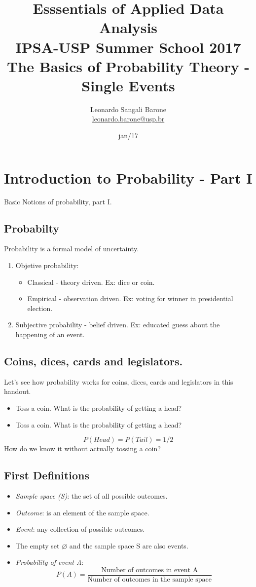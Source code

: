 \documentclass[11pt]{article}
\title{\textbf{Esssentials of Applied Data Analysis\\
				IPSA-USP Summer School 2017}\newline\\
				The Basics of Probability Theory - Single Events}
\author{Leonardo Sangali Barone\\ \href{leonardo.barone@usp.br}{leonardo.barone@usp.br}}
\date{jan/17}
\let\emptyset\varnothing
\begin{document}
\maketitle

\section*{Introduction to Probability - Part I}

	Basic Notions of probability, part I.
	
	\subsection*{Probabilty}
	Probability is a formal model of uncertainty.

	\begin{enumerate}
	\item Objetive probability:
		\begin{itemize}
			\item Classical - theory driven. Ex: dice or coin.
			\item Empirical - observation driven. Ex: voting for winner in presidential election.
		\end{itemize}
	\item Subjective probability - belief driven. Ex: educated guess about the happening of an event.
	\end{enumerate}

	\subsection*{Coins, dices, cards and legislators.}
	
	Let's see how probability works for coins, dices, cards and legislators in this handout.
	
		\begin{itemize}
			\item Toss a coin. What is the probability of getting a head?
			\item Toss a coin. What is the probability of getting a head?
		\end{itemize}
	\[P(Head) = P(Tail) = 1/2	\]
	How do we know it without actually tossing a coin?

	\subsection*{First Definitions}
	\begin{itemize}
		\item \emph{Sample space (S)}: the set of all possible outcomes.
		\item \emph{Outcome}: is an element of the sample space.
		\item \emph{Event}: any collection of possible outcomes.
		\item The empty set $\emptyset$ and the sample space S are also events.	
		\item \emph{Probability of event A}:
			\[P(A) = \frac{\text{Number of outcomes in event A}}
			{\text{Number of outcomes in the sample space}}\]		
	\end {itemize}
\end{document}

